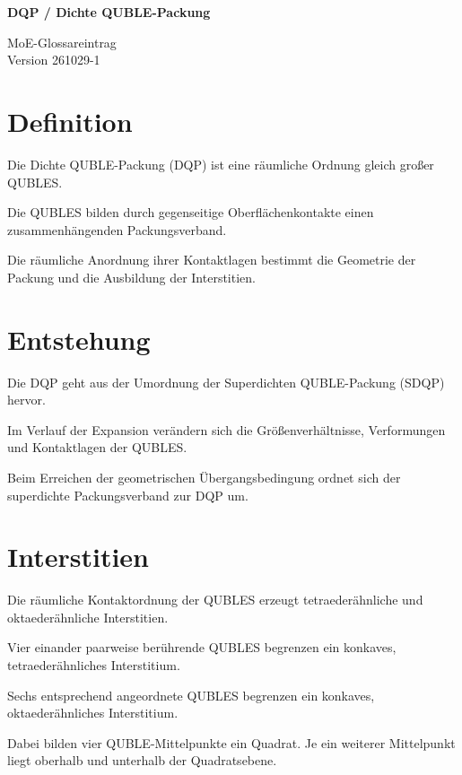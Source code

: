 \documentclass[11pt,a4paper]{article}
\begin{document}
\vspace*{-1.8cm}

\noindent
\begin{minipage}[t]{0.66\textwidth}
{\LARGE\bfseries DQP / Dichte QUBLE-Packung}
\end{minipage}
\hfill
\begin{minipage}[t]{0.30\textwidth}
\raggedleft
{\small MoE-Glossareintrag}\\
{\small Version 261029-1}
\end{minipage}

\vspace{1.4em}

\section*{Definition}

Die Dichte QUBLE-Packung (DQP) ist eine
räumliche Ordnung gleich großer QUBLES.

Die QUBLES bilden durch gegenseitige
Oberflächenkontakte einen zusammenhängenden
Packungsverband.

Die räumliche Anordnung ihrer Kontaktlagen
bestimmt die Geometrie der Packung und
die Ausbildung der Interstitien.

\section*{Entstehung}

Die DQP geht aus der Umordnung der
Superdichten QUBLE-Packung (SDQP) hervor.

Im Verlauf der Expansion verändern sich
die Größenverhältnisse, Verformungen und
Kontaktlagen der QUBLES.

Beim Erreichen der geometrischen
Übergangsbedingung ordnet sich der
superdichte Packungsverband zur DQP um.

\section*{Interstitien}

Die räumliche Kontaktordnung der QUBLES
erzeugt tetraederähnliche und
oktaederähnliche Interstitien.

Vier einander paarweise berührende QUBLES
begrenzen ein konkaves, tetraederähnliches
Interstitium.

Sechs entsprechend angeordnete QUBLES
begrenzen ein konkaves, oktaederähnliches
Interstitium.

Dabei bilden vier QUBLE-Mittelpunkte
ein Quadrat. Je ein weiterer Mittelpunkt
liegt oberhalb und unterhalb der
Quadratsebene.
\end{document}
